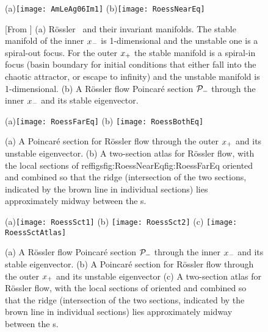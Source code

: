 \begin{figure}
(a)\texttt{[image: AmLeAg06Im1]}
(b)\texttt{[image: RoessNearEq]}
    \caption{[From ]
(a)
R\"ossler \eqva\ and their invariant manifolds. The stable manifold of
the inner {\eqv} $x_{-}$  is 1-dimensional and the unstable one is a
spiral-out focus. For the outer {\eqv} $x_{+}$  the stable manifold is
a spiral-in focus (basin boundary for initial conditions that either fall
into the chaotic attractor, or escape to infinity) and the unstable
manifold is 1-dimensional.
(b)
  A R\"ossler flow Poincar\'e section ${\cal P}_{-}$ through the inner
  {\eqv} $x_{-}$ and its stable eigenvector.
    }
\label{fig:AmLeAg06Im1}
\end{figure}

\begin{figure}%
\begin{center}
(a)\texttt{[image: RoessFarEq]}
(b) \texttt{[image: RoessBothEq]}
\end{center}
  \caption[R\"ossler section, outer {\eqv}]{
(a) A Poincar\'e section for R\"ossler flow through the outer {\eqv}
$x_{+}$  and its unstable eigenvector.
(b)
  A two-section atlas for R\"ossler flow, with the local sections of
  reffigs{fig:RoessNearEq}{fig:RoessFarEq} oriented and combined so that
  the ridge (intersection of the two sections, indicated by the brown
  line in individual sections) lies  approximately midway between the
  \template s.
  } \label{fig:RoessFarEq1}
\end{figure}

\begin{figure}%
\begin{center}
(a)\texttt{[image: RoessSct1]}
(b) \texttt{[image: RoessSct2]}
(c) \texttt{[image: RoessSctAtlas]}
\end{center}
  \caption{\label{fig:RoessSct1}
(a) A R\"ossler flow Poincar\'e section ${\cal P}_{-}$ through the inner
  {\eqv} $x_{-}$ and its stable eigenvector.
(b)
  A Poincar\'e section for R\"ossler flow
      through the
      outer
  {\eqv} $x_{+}$  and its unstable eigenvector
(c)
  A two-section atlas for R\"ossler flow, with the local sections of
   oriented and combined so that
  the ridge (intersection of the two sections, indicated by the brown
  line in individual sections) lies  approximately midway between the
  \template s.
}
\end{figure}

